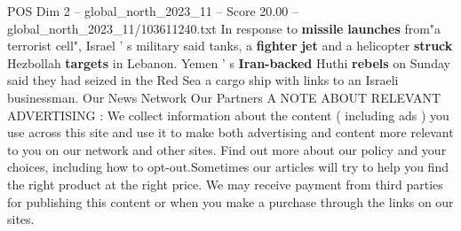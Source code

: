 \begin{textsample}{POS Dim 2 – global\_north\_2023\_11 – Score 20.00 – global\_north\_2023\_11/103611240.txt}
In response to \textbf{missile} \textbf{launches} from"a terrorist cell", Israel ' s military said tanks, a \textbf{fighter} \textbf{jet} and a helicopter \textbf{struck} Hezbollah \textbf{targets} in Lebanon.
Yemen ' s \textbf{Iran-backed} Huthi \textbf{rebels} on Sunday said they had seized in the Red Sea a cargo ship with links to an Israeli businessman.
Our News Network Our Partners A NOTE ABOUT RELEVANT ADVERTISING : We collect information about the content ( including ads ) you use across this site and use it to make both advertising and content more relevant to you on our network and other sites.
Find out more about our policy and your choices, including how to opt-out.Sometimes our articles will try to help you find the right product at the right price.
We may receive payment from third parties for publishing this content or when you make a purchase through the links on our sites.

\end{textsample}
